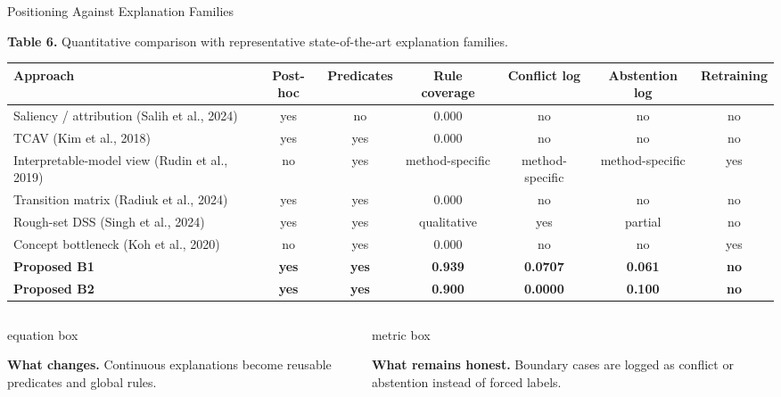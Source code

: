\documentclass[aspectratio=169,xcolor=dvipsnames]{beamer}
\begin{document}
\begin{frame}{Positioning Against Explanation Families}
\scriptsize
{\scriptsize\textbf{Table 6.} Quantitative comparison with representative
state-of-the-art explanation families.\par}
\vspace{0.18em}
\begin{tabularx}{\linewidth}{Ycccccc}
\toprule
\textbf{Approach} & \textbf{Post-hoc} & \textbf{Predicates} &
\textbf{Rule coverage} & \textbf{Conflict log} &
\textbf{Abstention log} & \textbf{Retraining}\\
\midrule
Saliency / attribution (Salih et al., 2024) & yes & no & 0.000 & no & no & no\\
TCAV (Kim et al., 2018) & yes & yes & 0.000 & no & no & no\\
Interpretable-model view (Rudin et al., 2019) & no & yes & method-specific & method-specific & method-specific & yes\\
Transition matrix (Radiuk et al., 2024) & yes & yes & 0.000 & no & no & no\\
Rough-set DSS (Singh et al., 2024) & yes & yes & qualitative & yes & partial & no\\
Concept bottleneck (Koh et al., 2020) & no & yes & 0.000 & no & no & yes\\
\textbf{Proposed B1} & \textbf{yes} & \textbf{yes} & \textbf{0.939} &
\textbf{0.0707} & \textbf{0.061} & \textbf{no}\\
\textbf{Proposed B2} & \textbf{yes} & \textbf{yes} & \textbf{0.900} &
\textbf{0.0000} & \textbf{0.100} & \textbf{no}\\
\bottomrule
\end{tabularx}
\vspace{0.20em}
\begin{columns}[T,onlytextwidth]
  \begin{beamercolorbox}[wd=\linewidth,sep=0.45em]{equation box}
  {\scriptsize\textbf{What changes.} Continuous explanations become reusable
  predicates and global rules.\par}
  \end{beamercolorbox}
  \begin{beamercolorbox}[wd=\linewidth,sep=0.45em]{metric box}
  {\scriptsize\textbf{What remains honest.} Boundary cases are logged as
  conflict or abstention instead of forced labels.\par}
  \end{beamercolorbox}
\end{columns}
\end{frame}
\end{document}

